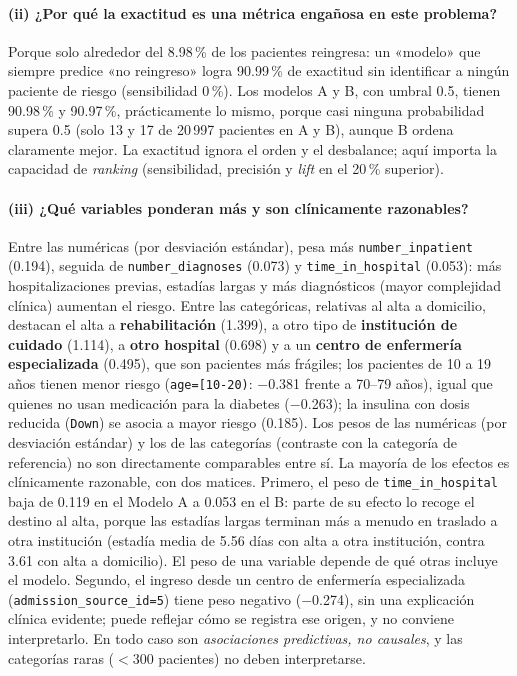 \documentclass[11pt,a4paper]{article}
\newcommand{\cod}[1]{\texttt{#1}}
\begin{document}
\paragraph{(ii) ¿Por qué la exactitud es una métrica engañosa en este problema?}
Porque solo alrededor del 8.98\,\% de los pacientes reingresa: un «modelo» que siempre predice «no reingreso» logra 90.99\,\% de exactitud sin identificar a ningún paciente de riesgo (sensibilidad 0\,\%). Los modelos A y B, con umbral 0.5, tienen 90.98\,\% y 90.97\,\%, prácticamente lo mismo, porque casi ninguna probabilidad supera 0.5 (solo 13 y 17 de 20\,997 pacientes en A y B), aunque B ordena claramente mejor. La exactitud ignora el orden y el desbalance; aquí importa la capacidad de \emph{ranking} (sensibilidad, precisión y \emph{lift} en el 20\,\% superior).

\paragraph{(iii) ¿Qué variables ponderan más y son clínicamente razonables?}
Entre las numéricas (por desviación estándar), pesa más \cod{number\_inpatient} (0.194), seguida de \cod{number\_diagnoses} (0.073) y \cod{time\_in\_hospital} (\mbox{0.053}): más hospitalizaciones previas, estadías largas y más diagnósticos (mayor complejidad clínica) aumentan el riesgo. Entre las categóricas, relativas al alta a domicilio, destacan el alta a \textbf{rehabilitación} (1.399), a otro tipo de \textbf{institución de cuidado} (1.114), a \textbf{otro hospital} (0.698) y a un \textbf{centro de enfermería especializada} (0.495), que son pacientes más frágiles; los pacientes de 10 a 19 años tienen menor riesgo (\cod{age=[10-20)}: \mbox{$-$0.381} frente a 70--79 años), igual que quienes no usan medicación para la diabetes (\mbox{$-$0.263}); la insulina con dosis reducida (\cod{Down}) se asocia a mayor riesgo (\mbox{0.185}). Los pesos de las numéricas (por desviación estándar) y los de las categorías (contraste con la categoría de referencia) no son directamente comparables entre sí. La mayoría de los efectos es clínicamente razonable, con dos matices. Primero, el peso de \cod{time\_in\_hospital} baja de \mbox{0.119} en el Modelo A a \mbox{0.053} en el B: parte de su efecto lo recoge el destino al alta, porque las estadías largas terminan más a menudo en traslado a otra institución (estadía media de 5.56 días con alta a otra institución, contra 3.61 con alta a domicilio). El peso de una variable depende de qué otras incluye el modelo. Segundo, el ingreso desde un centro de enfermería especializada (\cod{admission\_source\_id=5}) tiene peso negativo (\mbox{$-$0.274}), sin una explicación clínica evidente; puede reflejar cómo se registra ese origen, y no conviene interpretarlo. En todo caso son \emph{asociaciones predictivas, no causales}, y las categorías raras ($<300$ pacientes) no deben interpretarse.
\end{document}
